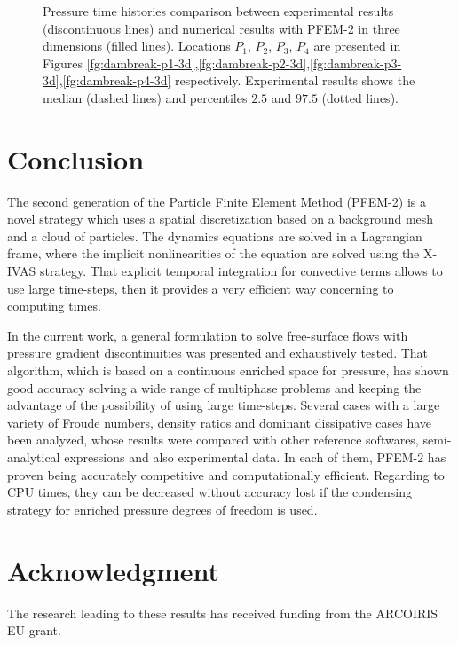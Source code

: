 \documentclass[a4paper,conference]{IEEEtran}
\begin{document}
\begin{figure}
{    }
   \caption{Pressure time histories comparison between experimental results\cite{Lobovsky13} (discontinuous lines) and numerical results with PFEM-2 in three dimensions (filled lines). Locations $P_1$, $P_2$, $P_3$, $P_4$ are presented in Figures \ref{fg:dambreak-p1-3d},\ref{fg:dambreak-p2-3d},\ref{fg:dambreak-p3-3d},\ref{fg:dambreak-p4-3d} respectively. Experimental results shows the median (dashed lines) and percentiles $2.5$ and $97.5$ (dotted lines).}
   \label{fg:dambreak-p-3d}                %
\end{figure}



\section{Conclusion}

The second generation of the Particle Finite Element Method (PFEM-2) is a novel strategy which uses a spatial discretization based on a background mesh and a cloud of particles. The dynamics equations are solved in a Lagrangian frame, where the implicit nonlinearities of the equation are solved using the {X-IVAS} strategy. That explicit temporal integration for convective terms allows to use large time-steps, then it provides a very efficient way concerning to computing times.

In the current work, a general formulation to solve free-surface flows with pressure gradient discontinuities was presented and exhaustively tested. That algorithm, which is based on a continuous enriched space for pressure, has shown good accuracy solving a wide range of multiphase problems and keeping the advantage of the possibility of using large time-steps. Several cases with a large variety of Froude numbers, density ratios and dominant dissipative cases have been analyzed, whose results were compared with other reference softwares, semi-analytical expressions and also experimental data. In each of them, PFEM-2 has proven being accurately competitive and computationally efficient. Regarding to CPU times, they can be decreased without accuracy lost if the condensing strategy for enriched pressure degrees of freedom is used.

\section*{Acknowledgment}
The research leading to these results has received funding from the ARCOIRIS EU grant.


\end{document}
